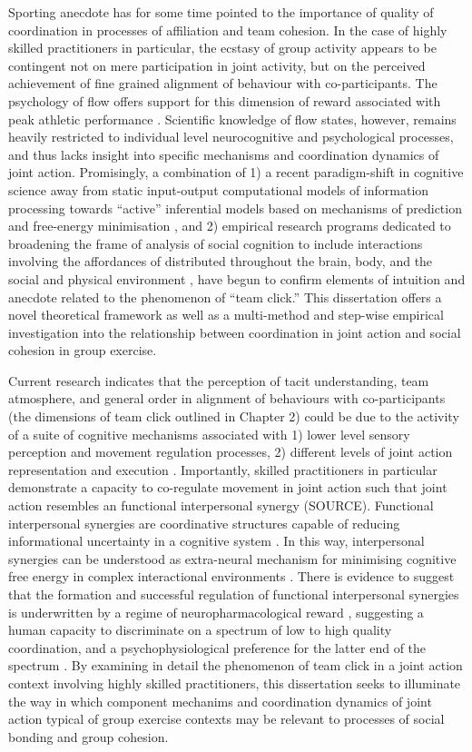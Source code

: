 Sporting anecdote has for some time pointed to the importance of quality of coordination in processes of affiliation and team cohesion.  In the case of highly skilled practitioners in particular, the ecstasy of group activity appears to be contingent not on mere participation in joint activity, but on the perceived achievement of fine grained alignment of behaviour with co-participants.  The psychology of flow offers support for this dimension of reward associated with peak athletic performance \citep{Jackson1995}. Scientific knowledge of flow states, however, remains heavily restricted to individual level neurocognitive and psychological processes, and thus lacks insight into specific mechanisms and coordination dynamics of joint action.  Promisingly, a combination of 1) a recent paradigm-shift in cognitive science away from static input-output computational models of information processing towards ``active'' inferential models based on mechanisms of prediction and free-energy minimisation \citep{Friston2010,Clark2013}, and 2) empirical research programs dedicated to broadening the frame of analysis of social cognition to include interactions involving the affordances of distributed throughout the brain, body, and the social and physical environment \citep{Sebanz2006,Semin2008}, have begun to confirm elements of intuition and anecdote related to the phenomenon of ``team click.''  This dissertation offers a novel theoretical framework as well as a multi-method and step-wise empirical investigation into the relationship between coordination in joint action and social cohesion in group exercise.

Current research indicates that the perception of tacit understanding, team atmosphere, and general order in alignment of behaviours with co-participants (the dimensions of team click outlined in Chapter 2) could be due to the activity of a suite of cognitive mechanisms associated with 1) lower level sensory perception and movement regulation processes, 2) different levels of joint action representation and execution \citep{Semin2008,Frith2008,Pesquita2017}.
Importantly, skilled practitioners in particular demonstrate a capacity to co-regulate movement in joint action such that joint action resembles an functional interpersonal synergy (SOURCE).  Functional interpersonal synergies are coordinative structures capable of reducing informational uncertainty in a cognitive system \citep{Riley2011}. In this way, interpersonal synergies can be understood as extra-neural mechanism for minimising cognitive free energy in complex interactional environments \citep{Clark2013}. There is evidence to suggest that the formation and successful regulation of functional interpersonal synergies is underwritten by a regime of neuropharmacological reward \citep{Ross2013}, suggesting a human capacity to discriminate on a spectrum of low to high quality coordination, and a psychophysiological preference for the latter end of the spectrum \citep{Marsh2009}.  By examining in detail the phenomenon of team click in a joint action context involving highly skilled practitioners, this dissertation seeks to illuminate the way in which component mechanims and coordination dynamics of joint action typical of group exercise contexts may be relevant to processes of social bonding and group cohesion.

